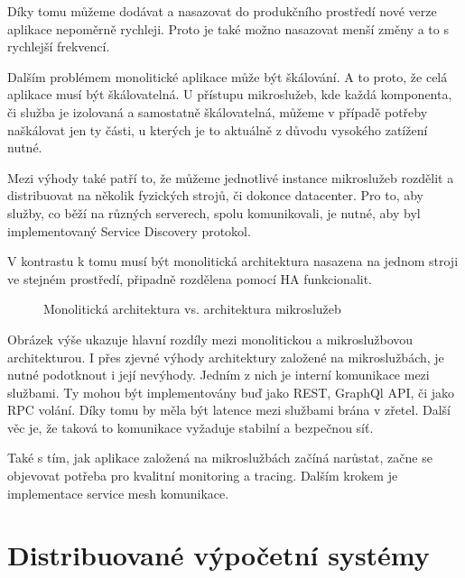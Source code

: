 \documentclass[thesis=M,czech]{FITthesis}[2019/12/23]
\theoremstyle{plain}
\theoremstyle{definition}
\begin{document}
Díky tomu můžeme dodávat a nasazovat do produkčního prostředí nové verze aplikace nepoměrně rychleji. Proto je také možno nasazovat menší změny a to s rychlejší frekvencí. 

Dalším problémem monolitické aplikace může být škálování. A to proto, že celá aplikace musí být škálovatelná. U přístupu mikroslužeb, kde každá komponenta, či služba je izolovaná a samostatně škálovatelná, můžeme v případě potřeby naškálovat jen ty části, u kterých je to aktuálně z důvodu vysokého zatížení nutné.

Mezi výhody také patří to, že můžeme jednotlivé instance mikroslužeb rozdělit a distribuovat na několik fyzických strojů, či dokonce datacenter. Pro to, aby služby, co běží na různých serverech, spolu komunikovali, je nutné, aby byl implementovaný Service Discovery protokol. 

V kontrastu k tomu musí být monolitická architektura nasazena na jednom stroji ve stejném prostředí, připadně rozdělena pomocí HA funkcionalit.


\begin{figure}[H]\centering
	

	\caption[Monolitická architektura vs. architektura mikroslužeb]{Monolitická architektura vs. architektura mikroslužeb}\label{fig:float}
\end{figure}


Obrázek výše ukazuje hlavní rozdíly mezi monolitickou a mikroslužbovou architekturou. I přes zjevné výhody architektury založené na mikroslužbách, je nutné podotknout i její nevýhody. Jedním z nich je interní komunikace mezi službami. Ty mohou být implementovány buď jako REST, GraphQl API, či jako RPC volání. Díky tomu by měla být latence mezi službami brána v zřetel. Další věc je, že taková to komunikace vyžaduje stabilní a bezpečnou síť.

Také s tím, jak aplikace založená na mikroslužbách začíná narůstat, začne se objevovat potřeba pro kvalitní monitoring a tracing. Dalším krokem je implementace service mesh komunikace.



\section{Distribuované výpočetní systémy}
\end{document}
